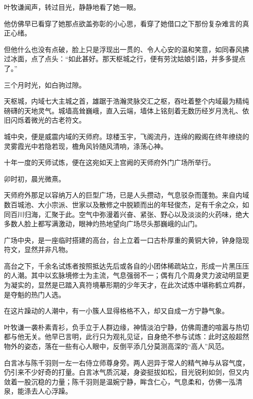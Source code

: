 叶牧谦闻声，转过目光，静静地看了她一眼。

他仿佛早已看穿了她那点欲盖弥彰的小心思，看穿了她借口之下那份复杂难言的真正心绪。

但他什么也没有点破，脸上只是浮现出一贯的、令人心安的温和笑意，如同春风拂过冰面，点了点头：“如此甚好。那天枢城之行，便有劳沈姑娘引路，并多多提点了。”

\vspace{2em}

三个月时光，如白驹过隙。

\vspace{2em}

天枢城，内域七大主城之首，雄踞于浩瀚灵脉交汇之枢，吞吐着整个内域最为精纯磅礴的天地灵气。城墙高耸巍峨，直入云端，墙体上铭刻着无数历经岁月洗礼、依旧闪烁着微光的古老符文。

城中央，便是威震内域的天师府。琼楼玉宇，飞阁流丹，连绵的殿阁在终年缭绕的灵雾霞光中若隐若现，檐角风铃随风清响，涤荡心神。

十年一度的天师试炼，便在这宛如天上宫阙的天师府外门广场所举行。

\vspace{2em}

卯时初，晨光微熹。

天师府外那足以容纳万人的巨型广场，已是人头攒动，气息驳杂而蓬勃。来自内域数百城池、大小宗派、世家以及散修之中脱颖而出的年轻俊杰，足有千余之众，如同百川归海，汇聚于此。空气中弥漫着兴奋、紧张、野心以及淡淡的火药味，绝大多数人脸上都写满激动，眼神灼热地望向广场尽头那巍峨的山门。

广场中央，是一座临时搭建的高台，台上立着一口古朴厚重的黄铜大钟，钟身隐现符文，显然并非凡物。

高台之下，千余名试炼者按照抵达先后或各自的小团体稀疏站立，形成一片黑压压的人潮。其中以玄脉境修士为主流，气息强弱不一；偶有几个周身灵力波动明显更为凝实的，显然是已踏入真符境摹形期的少年天才，在此次试炼中堪称鹤立鸡群，是夺魁的热门人选。

在这片躁动的人潮中，有一小簇人显得格格不入，却又自成一方宁静气象。

叶牧谦一袭朴素青衫，负手立于人群边缘，神情淡泊宁静，仿佛周遭的喧嚣与热切都与他无关。他早已言明，此行只为观礼见证，自身绝不参与试炼：此时这般超然物外的姿态，落在一些有心人眼中，反倒平添几分莫测高深的“高人”风范。

白言冰与陈千羽则一左一右侍立师尊身旁。两人迥异于常人的精气神与从容气度，仍引来不少好奇的打量。白言冰气质沉凝，身姿挺拔如松，目光锐利如剑，但又内敛着一股沉稳的力量；陈千羽则是温婉宁静，眸含仁心，气息柔和，仿佛一泓清泉，能涤去人心浮躁。

